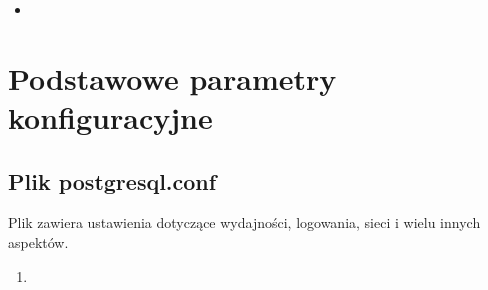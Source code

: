 \documentclass[letterpaper,10pt,polish]{sphinxmanual}
\begin{document}
\begin{sphinxVerbatim}[commandchars=\\\{\}]
\end{sphinxVerbatim}
\begin{itemize}
\item {} 
\sphinxAtStartPar
{}

\end{itemize}

\begin{sphinxVerbatim}[commandchars=\\\{\}]
\end{sphinxVerbatim}


\section{Podstawowe parametry konfiguracyjne}
\label{\detokenize{Konfiguracja-bazy-danych:podstawowe-parametry-konfiguracyjne}}

\subsection{Plik postgresql.conf}
\label{\detokenize{Konfiguracja-bazy-danych:plik-postgresql-conf}}
\sphinxAtStartPar
Plik  zawiera ustawienia dotyczące wydajności, logowania, sieci i wielu innych aspektów.

\sphinxAtStartPar
{}
\begin{enumerate}
%
\item {} 
\sphinxAtStartPar
{}

\end{enumerate}
\end{document}

